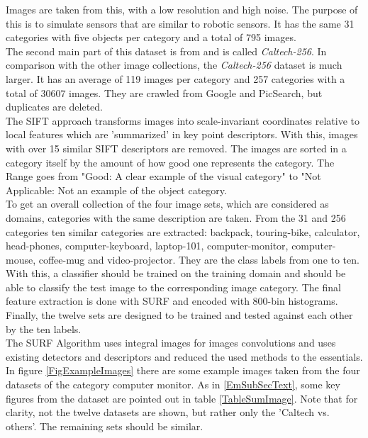 Images are taken from this, with a low resolution and high noise. The purpose of this is to simulate sensors that are similar to robotic sensors.
It has the same 31 categories with five objects per category and a total of 795 images. \\
The second main part of this dataset is from \cite{GregGriffin.} and is called \textit{Caltech-256}. In comparison with the other image collections, the \textit{Caltech-256} dataset is much larger.
It has an average of 119 images per category and 257 categories with a total of 30607 images.
They are crawled from Google and PicSearch, but duplicates are deleted.\cite{GregGriffin.}\\
The \ac{SIFT} approach transforms images into scale-invariant coordinates relative to local features which are 'summarized' in key point descriptors.\cite{Lowe.2004}
With this, images with over 15 similar \acs{SIFT} descriptors are removed.
The images are sorted in a category itself by the amount of how good one represents the category.
The Range goes from "Good: A clear example of the visual category" to "Not Applicable: Not an example of the object category.\cite[p.3]{GregGriffin.}\\
To get an overall collection of the four image sets, which are considered as domains, categories with the same description are taken.
From the 31 and 256 categories ten similar categories are extracted:
backpack, touring-bike, calculator, head-phones, computer-keyboard, laptop-101, computer-monitor, computer-mouse, coffee-mug and video-projector.
They are the class labels from one to ten. 
With this, a classifier should be trained on the training domain and should be able to classify the test image to the corresponding image category.
The final feature extraction is done with \ac{SURF} and encoded with 800-bin histograms.
Finally, the twelve sets are designed to be trained and tested against each other by the ten labels.\cite{Gong.} \\
The \ac{SURF} Algorithm uses integral images for images convolutions and uses existing detectors and descriptors and reduced the used methods to the essentials.\cite{vanBay.2006} 
In figure \ref{FigExampleImages} there are some example images taken from the four datasets of the category computer monitor. 
As in \ref{EmSubSecText}, some key figures from the dataset are pointed out in table \ref{TableSumImage}.
Note that for clarity, not the twelve datasets are shown, but rather only the 'Caltech vs. others'.
The remaining sets should be similar.
